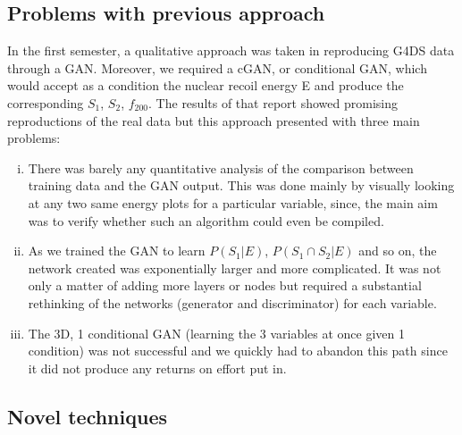 \documentclass[11pt]{article} %
\begin{document}
\subsection{Problems with previous approach}
In the first semester, a qualitative approach was taken in reproducing G4DS data through a GAN.
Moreover, we required a cGAN, or conditional GAN, which would accept as a condition the nuclear recoil energy E and produce the corresponding $S_1$, $S_2$, $f_{200}$.
The results of that report showed promising reproductions of the real data but this approach presented with three main problems:
\begin{enumerate}[i)]
  \item There was barely any quantitative analysis of the comparison between training data and the GAN output.
  This was done mainly by visually looking at any two same energy plots for a particular variable, since, the main aim was to verify whether such an algorithm could even be compiled.
  \item As we trained the GAN to learn $P(S_1|E)$, $P(S_1 \cap S_2|E)$ and so on, the network created was exponentially larger and more complicated.
  It was not only a matter of adding more layers or nodes but required a substantial rethinking of the networks (generator and discriminator) for each variable.
  \item The 3D, 1 conditional GAN (learning the 3 variables at once given 1 condition) was not successful and we quickly had to abandon this path since it did not produce any returns on effort put in.
\end{enumerate}
\subsection{Novel techniques}
\end{document}
